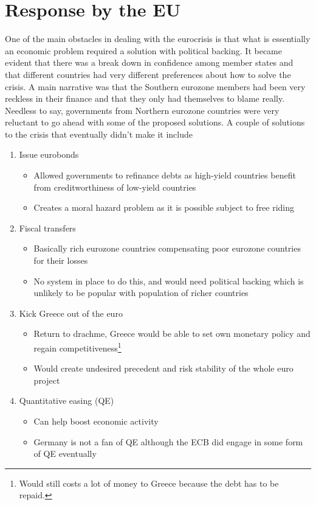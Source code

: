\documentclass{tufte-handout}
\begin{document}
\section{Response by the EU}
One of the main obstacles in dealing with the eurocrisis is that what is essentially an economic problem required a solution with political backing. 
It became evident that there was a break down in confidence among member states and that different countries had very different preferences about how to solve the crisis. 
A main narrative was that the Southern eurozone members had been very reckless in their finance and that they only had themselves to blame really. 
Needless to say, governments from Northern eurozone countries were very reluctant to go ahead with some of the proposed solutions. 
A couple of solutions to the crisis that eventually didn't make it include
\begin{enumerate}
  \item Issue eurobonds
  \begin{itemize}
    \item Allowed governments to refinance debts as high-yield countries benefit from creditworthiness of low-yield countries
    \item Creates a moral hazard problem as it is possible subject to free riding
  \end{itemize}
  \item Fiscal transfers
  \begin{itemize}
    \item Basically rich eurozone countries compensating poor eurozone countries for their losses
    \item No system in place to do this, and would need political backing which is unlikely to be popular with population of richer countries
  \end{itemize}
  \item Kick Greece out of the euro
  \begin{itemize}
    \item Return to drachme, Greece would be able to set own monetary policy and regain competitiveness\footnote{Would still costs a lot of money to Greece because the debt has to be repaid.}
    \item Would create undesired precedent and risk stability of the whole euro project
  \end{itemize}
  \item Quantitative easing (QE)
  \begin{itemize}
    \item Can help boost economic activity
    \item Germany is not a fan of QE although the ECB did engage in some form of QE eventually
  \end{itemize}
\end{enumerate}
\end{document}
